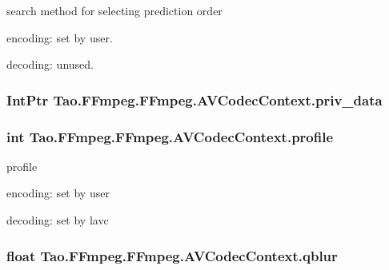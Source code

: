 \label{struct_tao_1_1_f_fmpeg_1_1_f_fmpeg_1_1_a_v_codec_context_aff9132cb106ba32c1939271160790d08}
search method for selecting prediction order
\begin{DoxyItemize}
\item encoding: set by user.
\item decoding: unused. 
\end{DoxyItemize}\hypertarget{struct_tao_1_1_f_fmpeg_1_1_f_fmpeg_1_1_a_v_codec_context_a0222b470ac964f9d165a2473efc45446}{
\subsubsection[{priv\_\-data}]{\setlength{\rightskip}{0pt plus 5cm}IntPtr {\bf Tao.FFmpeg.FFmpeg.AVCodecContext.priv\_\-data}}}
\label{struct_tao_1_1_f_fmpeg_1_1_f_fmpeg_1_1_a_v_codec_context_a0222b470ac964f9d165a2473efc45446}
\hypertarget{struct_tao_1_1_f_fmpeg_1_1_f_fmpeg_1_1_a_v_codec_context_ad62065e63bb7be68b6c6b077aab2d99e}{
\subsubsection[{profile}]{\setlength{\rightskip}{0pt plus 5cm}int {\bf Tao.FFmpeg.FFmpeg.AVCodecContext.profile}}}
\label{struct_tao_1_1_f_fmpeg_1_1_f_fmpeg_1_1_a_v_codec_context_ad62065e63bb7be68b6c6b077aab2d99e}
profile
\begin{DoxyItemize}
\item encoding: set by user
\item decoding: set by lavc 
\end{DoxyItemize}\hypertarget{struct_tao_1_1_f_fmpeg_1_1_f_fmpeg_1_1_a_v_codec_context_a719cc58978dc1aaa2e9790ca7b32af77}{
\subsubsection[{qblur}]{\setlength{\rightskip}{0pt plus 5cm}float {\bf Tao.FFmpeg.FFmpeg.AVCodecContext.qblur}}}
